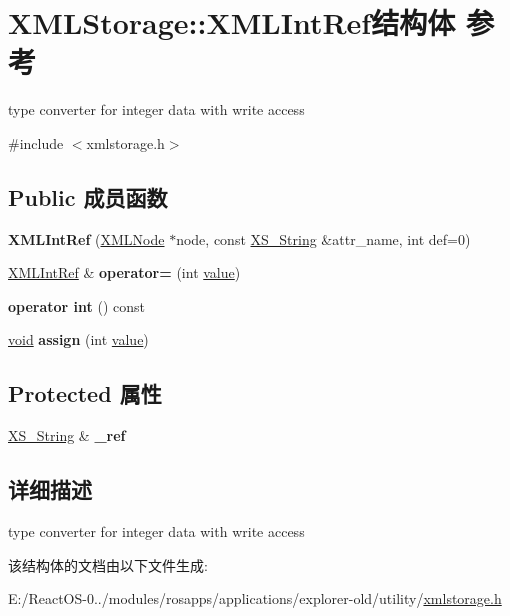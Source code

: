 \hypertarget{struct_x_m_l_storage_1_1_x_m_l_int_ref}{}\section{X\+M\+L\+Storage\+:\+:X\+M\+L\+Int\+Ref结构体 参考}
\label{struct_x_m_l_storage_1_1_x_m_l_int_ref}


type converter for integer data with write access  




{\ttfamily \#include $<$xmlstorage.\+h$>$}

\subsection*{Public 成员函数}
\begin{DoxyCompactItemize}
\item 
\mbox{\label{struct_x_m_l_storage_1_1_x_m_l_int_ref_a61cae87f0c301d0062988ce355ae8176}} 
{\bfseries X\+M\+L\+Int\+Ref} (\hyperlink{struct_x_m_l_storage_1_1_x_m_l_node}{X\+M\+L\+Node} $\ast$node, const \hyperlink{struct_x_m_l_storage_1_1_x_s___string}{X\+S\+\_\+\+String} \&attr\+\_\+name, int def=0)
\item 
\mbox{\label{struct_x_m_l_storage_1_1_x_m_l_int_ref_af1ef17bbee99dd3e0dcf6b5b7ddf7559}} 
\hyperlink{struct_x_m_l_storage_1_1_x_m_l_int_ref}{X\+M\+L\+Int\+Ref} \& {\bfseries operator=} (int \hyperlink{unionvalue}{value})
\item 
\mbox{\label{struct_x_m_l_storage_1_1_x_m_l_int_ref_ab55a3355208602eb95e52fa5abdbb836}} 
{\bfseries operator int} () const
\item 
\mbox{\label{struct_x_m_l_storage_1_1_x_m_l_int_ref_aa11ee64d421e1ca8ee297d4b4017849d}} 
\hyperlink{interfacevoid}{void} {\bfseries assign} (int \hyperlink{unionvalue}{value})
\end{DoxyCompactItemize}
\subsection*{Protected 属性}
\begin{DoxyCompactItemize}
\item 
\mbox{\label{struct_x_m_l_storage_1_1_x_m_l_int_ref_a9d9510fe5afa3cba55ec23018fa51084}} 
\hyperlink{struct_x_m_l_storage_1_1_x_s___string}{X\+S\+\_\+\+String} \& {\bfseries \+\_\+ref}
\end{DoxyCompactItemize}


\subsection{详细描述}
type converter for integer data with write access 

该结构体的文档由以下文件生成\+:\begin{DoxyCompactItemize}
\item 
E\+:/\+React\+O\+S-\/0../modules/rosapps/applications/explorer-\/old/utility/\hyperlink{xmlstorage_8h}{xmlstorage.\+h}\end{DoxyCompactItemize}
